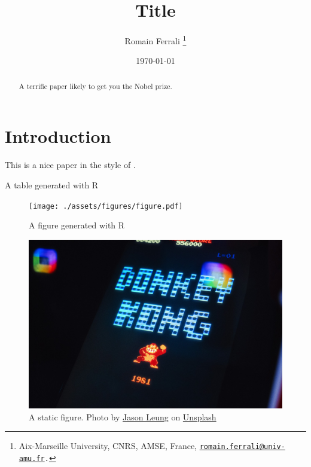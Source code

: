 \documentclass[11pt]{article}
\title{
    Title
}
\author{
    Romain Ferrali
    \thanks{
        Aix-Marseille University, CNRS, AMSE, France, {\tt \href{mailto:romain.ferrali@univ-amu.fr}{romain.ferrali@univ-amu.fr}.}
    }
}
\date{\today}
\theoremstyle{definition}
\theoremstyle{remark}
\begin{document}
\sloppy %

\if{}
    \maketitle
    \begin{abstract}
        A terrific paper likely to get you the Nobel prize.
    \end{abstract}
\fi

\section{Introduction}

This is a nice paper in the style of \citet{Ferrali}.

\begin{table}[H]
    \centering
    
    \caption{A table generated with R}
    \label{tab:r_table}
\end{table}

\begin{figure}
    \centering
    \texttt{[image: ./assets/figures/figure.pdf]}
    \caption{A figure generated with R}
    \label{fig:r_figure}
\end{figure}

\begin{figure}
    \centering
    \includegraphics[width=\textwidth]{./assets/static/dk.jpg}
    \caption{A static figure. Photo by \href{https://unsplash.com/@ninjason?utm_content=creditCopyText&utm_medium=referral&utm_source=unsplash}{Jason Leung} on \href{https://unsplash.com/photos/donkey-kong-arcade-game-screen-with-1981-date-c5tiCWrZADc?utm_content=creditCopyText&utm_medium=referral&utm_source=unsplash}{Unsplash}
    }
    \label{fig:nice_figure}
\end{figure}

\newpage



\newpage

\end{document}
